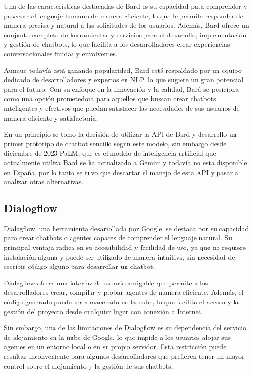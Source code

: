 Una de las características destacadas de Bard es su capacidad para comprender y procesar el lenguaje humano de manera eficiente, lo que le permite responder de manera precisa y natural a las solicitudes de los usuarios. Además, Bard ofrece un conjunto completo de herramientas y servicios para el desarrollo, implementación y gestión de chatbots, lo que facilita a los desarrolladores crear experiencias conversacionales fluidas y envolventes.

Aunque todavía está ganando popularidad, Bard está respaldado por un equipo dedicado de desarrolladores y expertos en NLP, lo que sugiere un gran potencial para el futuro. Con su enfoque en la innovación y la calidad, Bard se posiciona como una opción prometedora para aquellos que buscan crear chatbots inteligentes y efectivos que puedan satisfacer las necesidades de sus usuarios de manera eficiente y satisfactoria.

En un principio se tomo la decisión de utilizar la API de Bard y desarrollo un primer prototipo de chatbot sencillo según este modelo, sin embargo desde diciembre de 2023 PaLM, que es el modelo de inteligencia artificial que actualmente utiliza Bard se ha actualizado a Gemini y todavía no esta disponible en España, por lo tanto se tuvo que descartar el manejo de esta API y pasar a analizar otras alternativas. 
\subsection{Dialogflow}
Dialogflow, una herramienta desarrollada por Google, se destaca por su capacidad para crear chatbots o agentes capaces de comprender el lenguaje natural. Su principal ventaja radica en su accesibilidad y facilidad de uso, ya que no requiere instalación alguna y puede ser utilizado de manera intuitiva, sin necesidad de escribir código alguno para desarrollar un chatbot.

Dialogflow ofrece una interfaz de usuario amigable que permite a los desarrolladores crear, compilar y probar agentes de manera eficiente. Además, el código generado puede ser almacenado en la nube, lo que facilita el acceso y la gestión del proyecto desde cualquier lugar con conexión a Internet.

Sin embargo, una de las limitaciones de Dialogflow es su dependencia del servicio de alojamiento en la nube de Google, lo que impide a los usuarios alojar sus agentes en un entorno local o en su propio servidor. Esta restricción puede resultar inconveniente para algunos desarrolladores que prefieren tener un mayor control sobre el alojamiento y la gestión de sus chatbots.

